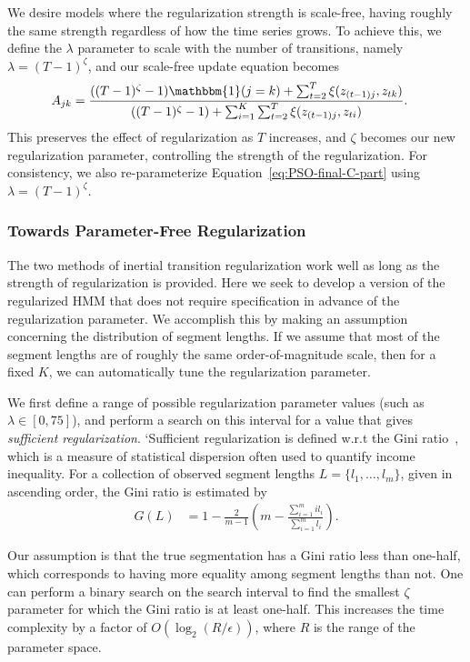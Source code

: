 \documentclass[letterpaper]{article}
\begin{document}
We desire models where the regularization strength is scale-free, having roughly the same strength regardless of how the time series grows. To achieve this, we define the $\lambda$ parameter to scale with the number of transitions, namely $\lambda = (T-1)^\zeta$, and our scale-free update equation becomes
\begin{align}\label{eq:SCALE-FREE-MAP}
    A_{jk} &= \frac{((T - 1)^{\zeta}-1){\mathbbm{1}(j = k)} + \sum_{t=2}^{T} \xi(z_{(t-1)j}, z_{tk})}   
    {((T - 1)^{\zeta} - 1) + \sum_{i=1}^{K}\sum_{t=2}^{T} \xi(z_{(t-1)j}, z_{ti})}.
\end{align}
This preserves the effect of regularization as $T$ increases, and $\zeta$
becomes our new regularization parameter, controlling the strength of the
regularization. For consistency, we also re-parameterize
Equation~\ref{eq:PSO-final-C-part} using $\lambda =
(T-1)^\zeta$.

\subsubsection{Towards Parameter-Free Regularization}\label{sec:param-free}

The two methods of inertial transition regularization work well as long as the strength of regularization is provided. Here we seek to develop a version of the regularized HMM that does not require specification in advance of the regularization parameter. We accomplish this by making an assumption concerning the distribution of segment lengths. If we assume that most of the segment lengths are of roughly the same order-of-magnitude scale, then for a fixed $K$, we can automatically tune the regularization parameter.

We first define a range of possible regularization parameter values (such as
$\lambda \in [0, 75]$), and perform a search on this interval for a value that
gives \emph{sufficient regularization}. `Sufficient regularization is defined
w.r.t the Gini ratio~\cite{gini1936,wiki:1}, which is a measure of
statistical dispersion often used to quantify income inequality. For a
collection of observed segment lengths $L = \{l_1, \ldots, l_m\}$, given in
ascending order, the Gini ratio is estimated by
\begin{align*}
    G(L) &= 1 - \frac{2}{m-1}\left(m - \frac{\sum_{i=1}^{m} i l_i}{\sum_{i=1}^{m} l_i}\right).
\end{align*}

Our assumption is that the true segmentation has a Gini ratio less than
one-half, which corresponds to having more equality among segment lengths than
not. One can perform a binary search on the search interval to find the smallest
$\zeta$ parameter for which the Gini ratio is at least one-half. This increases
the time complexity by a factor of $O(\log_2 (R / \epsilon))$, where $R$ is the
range of the parameter space.
\end{document}
